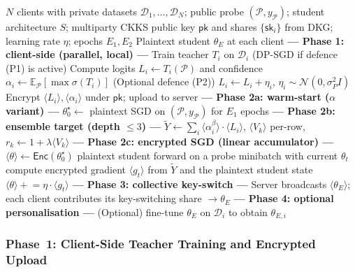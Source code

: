 \begin{algorithm}[t!]
\small
\caption{Encrypted CFD (one round)}
\label{alg:cfd}
\begin{algorithmic}[1]
\REQUIRE $N$ clients with private datasets $\mathcal{D}_1, \ldots, \mathcal{D}_N$; public probe $(\mathcal P, y_{\mathcal P})$; student architecture $S$; multiparty CKKS public key $\mathsf{pk}$ and shares $\{\mathsf{sk}_i\}$ from DKG; learning rate $\eta$; epochs $E_1, E_2$
\ENSURE Plaintext student $\theta_E$ at each client
\STATE \textbf{--- Phase 1: client-side (parallel, local) ---}
    \STATE Train teacher $T_i$ on $\mathcal{D}_i$ (DP-SGD if defence (P1) is active)
    \STATE Compute logits $L_i \leftarrow T_i(\mathcal{P})$ and confidence $\alpha_i \leftarrow \mathbb{E}_{\mathcal{P}}[\max\sigma(T_i)]$
    \STATE (Optional defence (P2)) $L_i \leftarrow L_i + \eta_i$, $\eta_i \sim \mathcal N(0, \sigma_P^2 I)$
    \STATE Encrypt $\langle L_i\rangle, \langle\alpha_i\rangle$ under $\mathsf{pk}$; upload to server \hfill{}
\ENDFOR
\STATE \textbf{--- Phase 2a: warm-start ($\alpha$ variant) ---}
\STATE $\theta_0^\star \leftarrow$ plaintext SGD on $(\mathcal{P}, y_{\mathcal P})$ for $E_1$ epochs
\STATE \textbf{--- Phase 2b: ensemble target (depth $\leq 3$) ---}
\STATE $\widetilde Y \leftarrow \sum_i \langle\alpha_i^\beta\rangle \cdot \langle L_i\rangle$, $\langle V_k\rangle$ per-row, $r_k \leftarrow 1 + \lambda\langle V_k\rangle$ \hfill{}
\STATE \textbf{--- Phase 2c: encrypted SGD (linear accumulator) ---}
\STATE $\langle\theta\rangle \leftarrow \mathsf{Enc}(\theta_0^\star)$
    \STATE plaintext student forward on a probe minibatch with current $\theta_t$
    \STATE compute encrypted gradient $\langle g_t\rangle$ from $\widetilde Y$ and the plaintext student state
    \STATE $\langle\theta\rangle \mathrel{+}= \eta \cdot \langle g_t\rangle$ \hfill{}
\ENDFOR
\STATE \textbf{--- Phase 3: collective key-switch ---}
\STATE Server broadcasts $\langle\theta_E\rangle$; each client contributes its key-switching share $\to \theta_E$
\STATE \textbf{--- Phase 4: optional personalisation ---}
    \STATE (Optional) fine-tune $\theta_E$ on $\mathcal{D}_i$ to obtain $\theta_{E,i}$
\ENDFOR
\end{algorithmic}
\end{algorithm}


\subsubsection{Phase~1: Client-Side Teacher Training and Encrypted Upload}
\label{sec:phase1}

